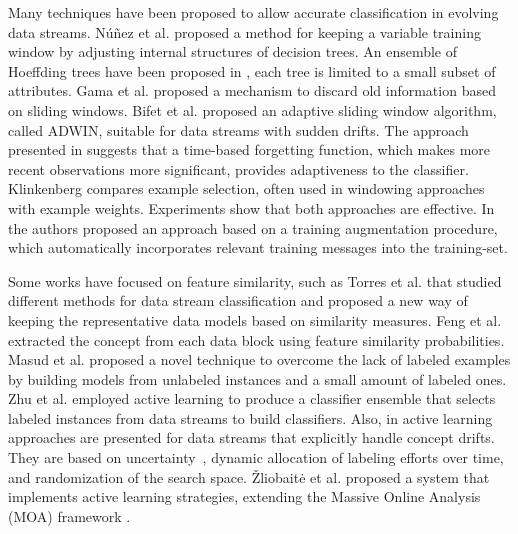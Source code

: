 \documentclass{sig-alternate}
\begin{document}
Many techniques have been proposed to allow accurate classification in evolving data
streams.  N\'{u}\~{n}ez et al. \cite{Nunez:2007:LEU:1314498.1390328} proposed a
method for keeping a variable training window by adjusting internal
structures of decision trees. An ensemble of Hoeffding trees have been proposed
in \cite{Bifet:2012:ERH:2089094.2089106}, each tree is limited to a small subset of
attributes. Gama et al.\cite{Gama2009a} proposed a mechanism to discard old
information based on sliding windows. Bifet et al.  \cite{Bifet2007,
Bifet:2009:ALE:1617420.1617445} proposed an adaptive sliding window algorithm,
called ADWIN, suitable for data streams with sudden drifts.
The approach presented in
\cite{Koychev00gradualforgetting} suggests that a time-based
forgetting function, which makes more recent observations more significant,
provides adaptiveness to the classifier.
Klinkenberg \cite{Klinkenberg:2004:LDC:1293831.1293836} compares example selection, often
used in windowing approaches with example weights. Experiments
show that both approaches are effective.
In \cite{sigir} the
authors proposed an approach based on a training augmentation procedure, which
automatically incorporates
relevant training messages into the training-set.

Some works have focused on feature similarity, such as Torres et al.
\cite{Torres:2011:CMD:2025756.2025758} that studied different methods for data
stream classification and proposed a new way of keeping the representative
data models based on similarity measures.
Feng et al. \cite{Feng2013} extracted the
concept from each data block using feature similarity
probabilities. 
Masud et al. \cite{Masud:2008:PAC:1510528.1511337} proposed a novel technique
to overcome the lack of labeled examples by building models
from unlabeled instances and a small amount of labeled ones.
Zhu et al. \cite{5440901} employed active learning to produce a
classifier ensemble that selects labeled instances from data streams to
build classifiers. Also, in \cite{6414645,Indre2011k} active
learning approaches are presented for data streams that explicitly handle
concept drifts. They are based on uncertainty~\cite{uncertainty}, dynamic allocation 
of labeling efforts over time, and randomization of the search space. \v{Z}liobait\.{e} et
al.  \cite{DBLP:journals/jmlr/ZliobaiteBHP11} proposed a system that implements active
learning strategies, extending the Massive Online Analysis (MOA) framework \cite{moa}.
\end{document}
